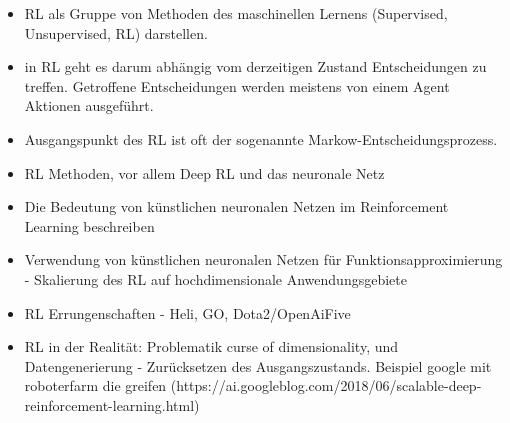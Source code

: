 \begin{itemize}
\item RL als Gruppe von Methoden des maschinellen Lernens (Supervised, Unsupervised, RL) darstellen. 

\item in RL geht es darum abhängig vom derzeitigen Zustand Entscheidungen zu treffen. Getroffene Entscheidungen werden meistens von einem Agent Aktionen ausgeführt.

\item Ausgangspunkt des RL ist oft der sogenannte Markow-Entscheidungsprozess. 

\item RL Methoden, vor allem Deep RL und das neuronale Netz

\item Die Bedeutung von künstlichen neuronalen Netzen im Reinforcement Learning beschreiben

\item Verwendung von künstlichen neuronalen Netzen für Funktionsapproximierung - Skalierung des RL auf hochdimensionale Anwendungsgebiete

\item RL Errungenschaften - Heli, GO, Dota2/OpenAiFive

\item RL in der Realität: Problematik curse of dimensionality, und Datengenerierung - Zurücksetzen des Ausgangszustands. Beispiel google mit roboterfarm die greifen (https://ai.googleblog.com/2018/06/scalable-deep-reinforcement-learning.html)

\end{itemize}




